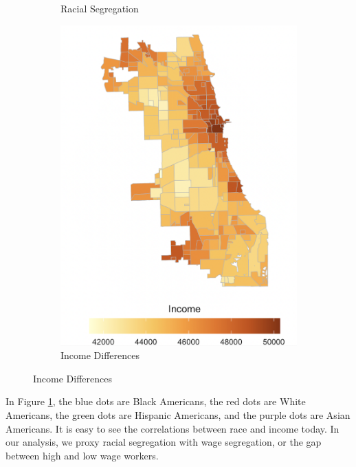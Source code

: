 \documentclass[12pt]{article}
\begin{document}
\begin{figure}[h!]
\begin{subfigure}{0.52\textwidth}
         \caption{Racial Segregation}
         \label{fig:racial_divide}
    \end{subfigure}  
    \begin{subfigure}{0.45\textwidth}
         \centering
         \includegraphics[width=\linewidth]{Pset1/Figures/Descriptive/income_map.png}
         \caption{Income Differences}
        \label{fig:income_divide}
    \end{subfigure}
\end{figure}
In Figure \ref{fig:racial_divide}, the blue dots are Black Americans, the red dots are White Americans, the green dots are Hispanic Americans, and the purple dots are Asian Americans. It is easy to see the correlations between race and income today. In our analysis, we proxy racial segregation with wage segregation, or the gap between high and low wage workers.
\end{document}
